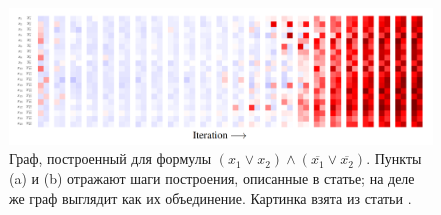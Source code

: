 \begin{figure}[ht]
\begin{center}
    \includegraphics[scale=0.24]{./assets/neurosat-voting.png}
    \caption{\label{neurosat-voting} Граф, построенный для формулы $(x_1 \vee x_2) \wedge (\overline{x_1} \vee \overline{x_2})$. Пункты (a) и (b) отражают шаги построения, описанные в статье; на деле же граф выглядит как их объединение. Картинка взята из статьи \cite{neurosat-paper}.}
\end{center}
\end{figure}




